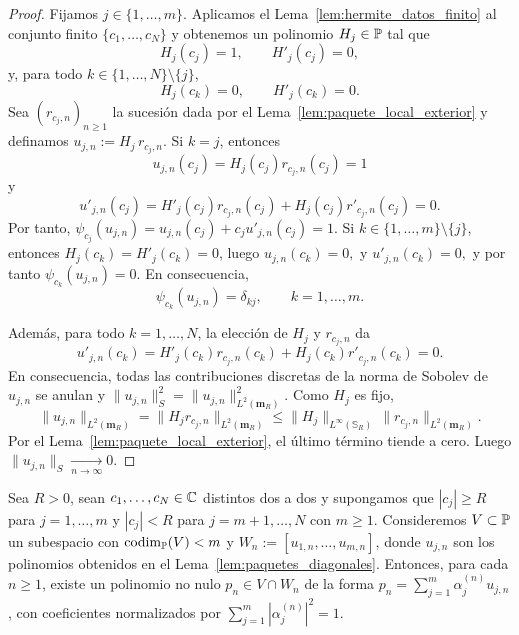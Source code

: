\begin{proof}
	Fijamos $j\in\{1,\dots,m\}$. Aplicamos el Lema~\ref{lem:hermite_datos_finito} al conjunto finito $\{c_1,\dots,c_N\}$ y obtenemos un polinomio $H_j\in\mathbb{P}$ tal que
	\[
		H_j(c_j)=1,
		\qquad
		H'_j(c_j)=0,
	\]
	y, para todo $k\in\{1,\dots,N\}\setminus\{j\}$,
	\[
		H_j(c_k)=0,
		\qquad
		H'_j(c_k)=0.
	\]
	Sea $(r_{c_j,n})_{n\ge1}$ la sucesión dada por el Lema~\ref{lem:paquete_local_exterior} y definamos
	\(
	u_{j,n}:=H_j\,r_{c_j,n}.
	\) Si $k=j$, entonces
	\[
		u_{j,n}(c_j)=H_j(c_j)r_{c_j,n}(c_j)=1
	\]
	y
	\[
		u'_{j,n}(c_j)=H'_j(c_j)r_{c_j,n}(c_j)+H_j(c_j)r'_{c_j,n}(c_j)=0.
	\]
	Por tanto,
	\(
	\psi_{c_j}(u_{j,n})=u_{j,n}(c_j)+c_j u'_{j,n}(c_j)=1.
	\) Si $k\in\{1,\dots,m\}\setminus\{j\}$, entonces $H_j(c_k)=H'_j(c_k)=0$, luego
	\(
	u_{j,n}(c_k)=0,
	\) y \(
	u'_{j,n}(c_k)=0,
	\) y por tanto \(
	\psi_{c_k}(u_{j,n})=0.
	\) En consecuencia,
	\[
		\psi_{c_k}(u_{j,n})=\delta_{kj},
		\qquad k=1,\dots,m.
	\]

	Además, para todo $k=1,\dots,N$, la elección de $H_j$ y $r_{c_j,n}$ da
	\[
		u'_{j,n}(c_k)
		=
		H'_j(c_k)r_{c_j,n}(c_k)+H_j(c_k)r'_{c_j,n}(c_k)
		=
		0.
	\]
	En consecuencia, todas las contribuciones discretas de la norma de Sobolev de $u_{j,n}$ se anulan y
	\(
	\|u_{j,n}\|_S^2=\|u_{j,n}\|_{L^2(\mathbf{m}_R)}^2.
	\)
	Como $H_j$ es fijo,
	\[
		\|u_{j,n}\|_{L^2(\mathbf{m}_R)}
		=
		\|H_j r_{c_j,n}\|_{L^2(\mathbf{m}_R)}
		\le
		\|H_j\|_{L^\infty(\mathbb{S}_R)}\,\|r_{c_j,n}\|_{L^2(\mathbf{m}_R)}.
	\]
	Por el Lema~\ref{lem:paquete_local_exterior}, el último término tiende a cero. Luego
	\(
	\|u_{j,n}\|_S\xrightarrow[n\to\infty]{}0.
	\)
\end{proof}

\begin{lem}\label{lem:imposicion_restricciones}
	Sea $R>0$, sean $c_1,\dots,c_N\in\mathbb{C}$ distintos dos a dos y supongamos que $|c_j|\ge R$ para $j=1,\dots,m$ y $|c_j|<R$ para $j=m+1,\dots,N$ con $m\ge1$.
	Consideremos $V\subset\mathbb{P}$ un subespacio con $\operatorname{codim}_{\mathbb{P}}(V)<m$ y $W_n:=[u_{1,n},\dots,u_{m,n}]$, donde $u_{j,n}$ son los polinomios obtenidos en el Lema~\ref{lem:paquetes_diagonales}. Entonces, para cada $n\ge1$, existe un polinomio no nulo $p_n\in V\cap W_n$ de la forma $p_n=\sum_{j=1}^m \alpha_j^{(n)}u_{j,n}$, con coeficientes normalizados por $\sum_{j=1}^m |\alpha_j^{(n)}|^2=1$.
\end{lem}

